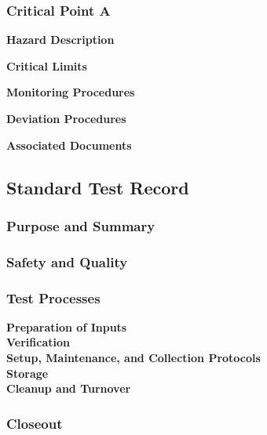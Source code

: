 

\subsubsection{Critical Point A}

\textbf{Hazard Description}

\textbf{Critical Limits}

\textbf{Monitoring Procedures}

\textbf{Deviation Procedures}

\textbf{Associated Documents}


\subsection{Standard Test Record}

\subsubsection{Purpose and Summary}

\subsubsection{Safety and Quality}

\subsubsection{Test Processes}

\textbf{Preparation of Inputs}\\


\textbf{Verification}\\


\textbf{Setup, Maintenance, and Collection Protocols}\\


\textbf{Storage}\\


\textbf{Cleanup and Turnover}\\


\subsubsection{Closeout}

